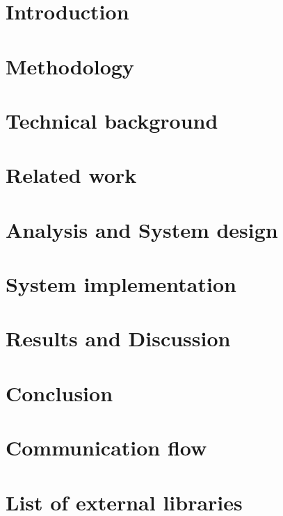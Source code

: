 \documentclass[Report.tex]{subfiles}
\begin{document}
\chapter{Introduction}\label{sec:intro}
  
\clearpage

\chapter{Methodology}\label{sec:methodology}
  
\clearpage

\chapter{Technical background}\label{sec:tech_background}
  
\clearpage

\chapter{Related work}\label{sec:similar}
  
\clearpage

\chapter{Analysis and System design}\label{sec:system}
  
\clearpage

\chapter{System implementation}\label{sec:system}
  
\clearpage

\chapter{Results and Discussion}\label{sec:discussion}
  
\clearpage

\chapter{Conclusion}\label{sec:conclusion}
  
\clearpage

\nocite{*} %
\printbibliography%
\clearpage

\begin{appendices}
\chapter{Communication flow}
  
\clearpage
\chapter{List of external libraries}
  \label{sec:libraries}
  
\end{appendices}
\end{document}
